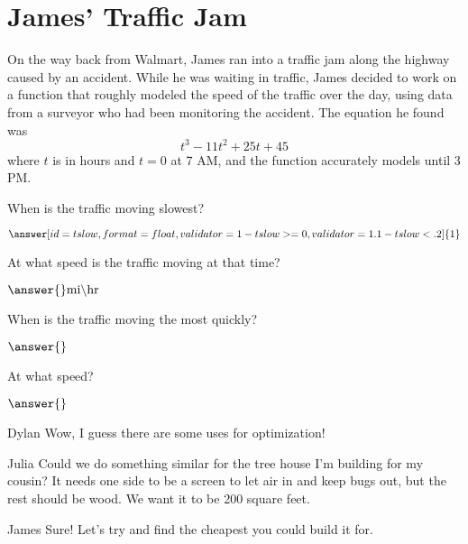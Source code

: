 \documentclass{ximera}
\begin{document}
\section{James' Traffic Jam}
On the way back from Walmart, James ran into a traffic jam along the highway caused by an accident. While he was waiting in traffic, James decided to work on a function that roughly modeled the speed of the traffic over the day, using data from a surveyor who had been monitoring the accident. The equation he found was $$t^3-11t^2+25t+45$$ where $t$ is in hours and $t = 0$ at 7 AM, and the function accurately models until 3 PM.
\begin{question}

When is the traffic moving slowest?

$\answer[id=tslow, format=float, validator=1-tslow>=0, validator=1.1-tslow<.2]{1}$ \begin{multipleChoice}
\end{multipleChoice}

At what speed is the traffic moving at that time?

$\answer{} \text{mi} \backslash \text{hr}$
\end{question}
\begin{question}

When is the traffic moving the most quickly?

$\answer{}$\begin{multipleChoice}
\end{multipleChoice}

At what speed?

$\answer{}$

\end{question}
\begin{dialogue}
\item[Dylan] Wow, I guess there are some uses for optimization!
\item[Julia] Could we do something similar for the tree house I'm building for my cousin? It needs one side to be a screen to let air in and keep bugs out, but the rest should be wood. We want it to be 200 square feet.
\item[James] Sure! Let's try and find the cheapest you could build it for.
\end{dialogue}
\end{document}
